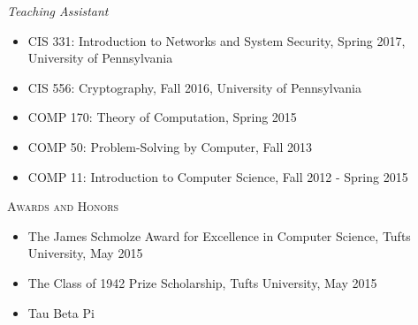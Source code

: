 \documentclass{article}
\begin{document}
\textit{Teaching Assistant}
\begin{itemize}[label={},noitemsep]
\item CIS 331: Introduction to Networks and System Security, Spring 2017, University of Pennsylvania
\item CIS 556: Cryptography, Fall 2016, University of Pennsylvania
\item COMP 170: Theory of Computation, Spring 2015
\item COMP 50: Problem-Solving by Computer, Fall 2013
\item COMP 11: Introduction to Computer Science, Fall 2012 - Spring 2015
\end{itemize}


\textsc{Awards and Honors}
\begin{itemize}[label={}]
\item The James Schmolze Award for Excellence in Computer Science, Tufts University, May 2015
\item The Class of 1942 Prize Scholarship, Tufts University, May 2015
\item Tau Beta Pi
\end{itemize}
\end{document}
